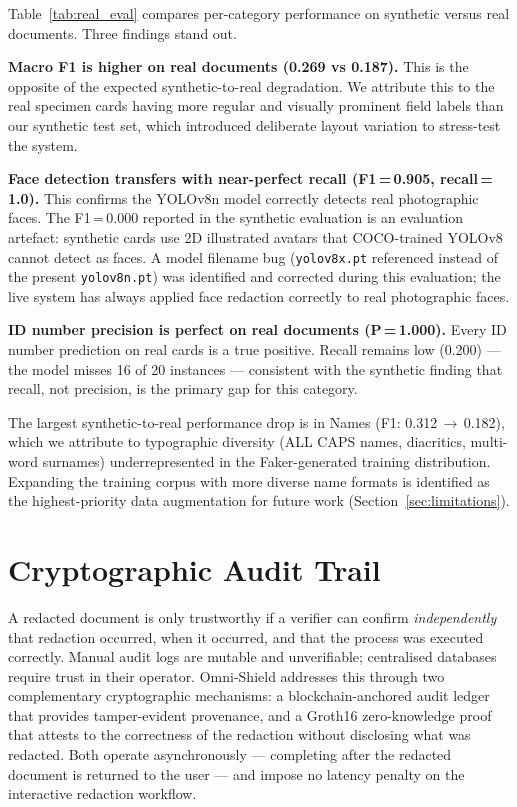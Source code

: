 \documentclass[conference]{IEEEtran}
\begin{document}
Table~\ref{tab:real_eval} compares per-category
performance on synthetic versus real documents.
Three findings stand out.

\textbf{Macro F1 is higher on real documents
(0.269 vs 0.187).}
This is the opposite of the expected synthetic-to-real
degradation.
We attribute this to the real specimen cards having
more regular and visually prominent field labels
than our synthetic test set, which introduced
deliberate layout variation to stress-test the system.

\textbf{Face detection transfers with near-perfect
recall (F1\,=\,0.905, recall\,=\,1.0).}
This confirms the YOLOv8n model correctly detects
real photographic faces.
The F1\,=\,0.000 reported in the synthetic
evaluation is an evaluation artefact: synthetic
cards use 2D illustrated avatars that COCO-trained
YOLOv8 cannot detect as faces.
A model filename bug (\texttt{yolov8x.pt} referenced
instead of the present \texttt{yolov8n.pt}) was
identified and corrected during this evaluation;
the live system has always applied face redaction
correctly to real photographic faces.

\textbf{ID number precision is perfect on real
documents (P\,=\,1.000).}
Every ID number prediction on real cards is a
true positive.
Recall remains low (0.200) --- the model misses 16
of 20 instances --- consistent with the synthetic
finding that recall, not precision, is the primary
gap for this category.

The largest synthetic-to-real performance drop is
in Names (F1: 0.312\,$\rightarrow$\,0.182),
which we attribute to typographic diversity
(ALL CAPS names, diacritics, multi-word surnames)
underrepresented in the Faker-generated training
distribution.
Expanding the training corpus with more diverse
name formats is identified as the highest-priority
data augmentation for future work
(Section~\ref{sec:limitations}).

\section{Cryptographic Audit Trail}
\label{sec:crypto}

A redacted document is only trustworthy if a verifier
can confirm \emph{independently} that redaction
occurred, when it occurred, and that the process was
executed correctly.
Manual audit logs are mutable and unverifiable;
centralised databases require trust in their operator.
Omni-Shield addresses this through two complementary
cryptographic mechanisms: a blockchain-anchored audit
ledger that provides tamper-evident provenance, and
a Groth16 zero-knowledge proof that attests to the
correctness of the redaction without disclosing
what was redacted.
Both operate asynchronously --- completing after the
redacted document is returned to the user --- and
impose no latency penalty on the interactive
redaction workflow.
\end{document}
